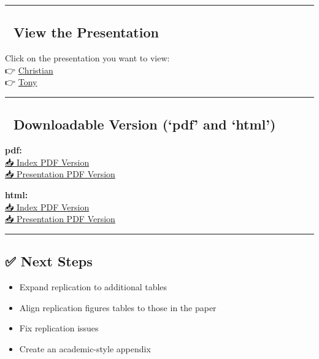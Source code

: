 \documentclass[
  man,
  longtable,
  nolmodern,
  notxfonts,
  notimes,
  colorlinks=true,linkcolor=blue,citecolor=blue,urlcolor=blue]{apa7}
\providecommand{\tightlist}{%
  \setlength{\itemsep}{0pt}\setlength{\parskip}{0pt}}
\begin{document}
\begin{center}\rule{0.5\linewidth}{0.5pt}\end{center}

\subsection{🎥 View the Presentation}\label{view-the-presentation}

Click on the presentation you want to view:\\
👉 \href{try.html}{Christian}\\
👉 \href{https://nanaosei95.github.io/replicapresentation}{Tony}

\begin{center}\rule{0.5\linewidth}{0.5pt}\end{center}

\subsection{📄 Downloadable Version (`pdf' and
`html')}\label{downloadable-version-pdf-and-html}

\textbf{pdf:}\\
\href{index.pdf}{📥 Index PDF Version}\\
\href{try.pdf}{📥 Presentation PDF Version}

\textbf{html:}\\
\href{index.html}{📥 Index PDF Version}\\
\href{try.html}{📥 Presentation PDF Version}

\begin{center}\rule{0.5\linewidth}{0.5pt}\end{center}

\subsection{✅ Next Steps}\label{next-steps}

\begin{itemize}
\tightlist
\item
  Expand replication to additional tables\\
\item
  Align replication figures tables to those in the paper\\
\item
  Fix replication issues\\
\item
  Create an academic-style appendix
\end{itemize}
\end{document}
